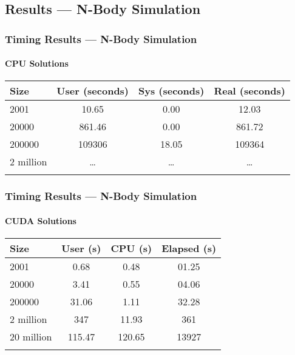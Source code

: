 \documentclass{beamer}
\begin{document}
\subsection{Results --- N-Body Simulation}
\begin{frame}
\frametitle{Timing Results --- N-Body Simulation}
\framesubtitle{CPU Solutions}
\begin{table}[htb]
\centering{}
\begin{tabular}{lccc}
\toprule{}
\textbf{Size} & \textbf{User (seconds)} &
\textbf{Sys (seconds)} & \textbf{Real (seconds)} \\
\midrule{}
2001          & 10.65   & 0.00    & 12.03 \\
\midrule{}
20000         & 861.46  & 0.00    & 861.72 \\
\midrule{}
200000        & 109306  & 18.05   & 109364 \\
\midrule{}
2 million     & \dots{} & \dots{} & \dots{} \\
\bottomrule{}
\end{tabular}
\end{table}
\end{frame}
\begin{frame}
\frametitle{Timing Results --- N-Body Simulation}
\framesubtitle{CUDA Solutions}
\begin{table}[htb]
\begin{tabular}{lccc}
\toprule{}
\textbf{Size} & \textbf{User (s)} &
\textbf{CPU (s)} & \textbf{Elapsed (s)} \\
\midrule{}
2001          & 0.68    & 0.48    & 01.25 \\
\midrule{}
20000         & 3.41    & 0.55    & 04.06 \\
\midrule{}
200000        & 31.06   & 1.11    & 32.28 \\
\midrule{}
2 million     & 347     & 11.93   & 361   \\
\midrule{}
20 million    & 115.47  & 120.65  & 13927 \\
\bottomrule{}
\end{tabular}
\end{table}
\end{frame}
\end{document}
